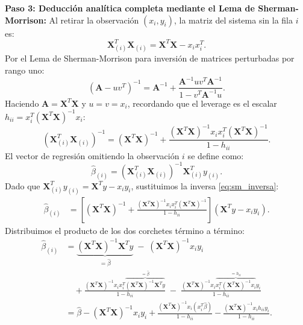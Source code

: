 \documentclass[11pt,a4paper]{article}
\begin{document}
\begin{demobox}
\textbf{Paso 3: Deducción analítica completa mediante el Lema de Sherman-Morrison:}  
Al retirar la observación $(x_i, y_i)$, la matriz del sistema sin la fila $i$ es:
\begin{equation}
\mathbf{X}_{(i)}^T \mathbf{X}_{(i)} = \mathbf{X}^T \mathbf{X} - x_i x_i^T.
\end{equation}
Por el Lema de Sherman-Morrison para inversión de matrices perturbadas por rango uno:
\begin{equation}
(\mathbf{A} - u v^T)^{-1} = \mathbf{A}^{-1} + \frac{\mathbf{A}^{-1} u v^T \mathbf{A}^{-1}}{1 - v^T \mathbf{A}^{-1} u}.
\end{equation}
Haciendo $\mathbf{A} = \mathbf{X}^T \mathbf{X}$ y $u = v = x_i$, recordando que el leverage es el escalar $h_{ii} = x_i^T (\mathbf{X}^T \mathbf{X})^{-1} x_i$:
\begin{equation}
(\mathbf{X}_{(i)}^T \mathbf{X}_{(i)})^{-1} = (\mathbf{X}^T \mathbf{X})^{-1} + \frac{(\mathbf{X}^T \mathbf{X})^{-1} x_i x_i^T (\mathbf{X}^T \mathbf{X})^{-1}}{1 - h_{ii}}. \label{eq:sm_inversa}
\end{equation}
El vector de regresión omitiendo la observación $i$ se define como:
\begin{equation}
\hat{\beta}_{(i)} = (\mathbf{X}_{(i)}^T \mathbf{X}_{(i)})^{-1} \mathbf{X}_{(i)}^T y_{(i)}.
\end{equation}
Dado que $\mathbf{X}_{(i)}^T y_{(i)} = \mathbf{X}^T y - x_i y_i$, sustituimos la inversa \eqref{eq:sm_inversa}:
\begin{align}
\hat{\beta}_{(i)} &= \left[ (\mathbf{X}^T \mathbf{X})^{-1} + \frac{(\mathbf{X}^T \mathbf{X})^{-1} x_i x_i^T (\mathbf{X}^T \mathbf{X})^{-1}}{1 - h_{ii}} \right] (\mathbf{X}^T y - x_i y_i).
\end{align}
Distribuimos el producto de los dos corchetes término a término:
\begin{align}
\hat{\beta}_{(i)} &= \underbrace{(\mathbf{X}^T \mathbf{X})^{-1} \mathbf{X}^T y}_{= \hat{\beta}} \;-\; (\mathbf{X}^T \mathbf{X})^{-1} x_i y_i \\
&\quad + \frac{(\mathbf{X}^T \mathbf{X})^{-1} x_i x_i^T \overbrace{(\mathbf{X}^T \mathbf{X})^{-1} \mathbf{X}^T y}^{= \hat{\beta}}}{1 - h_{ii}} \;-\; \frac{(\mathbf{X}^T \mathbf{X})^{-1} x_i \overbrace{x_i^T (\mathbf{X}^T \mathbf{X})^{-1} x_i}^{= h_{ii}} y_i}{1 - h_{ii}} \\[0.6em]
&= \hat{\beta} - (\mathbf{X}^T \mathbf{X})^{-1} x_i y_i + \frac{(\mathbf{X}^T \mathbf{X})^{-1} x_i (x_i^T \hat{\beta})}{1 - h_{ii}} - \frac{(\mathbf{X}^T \mathbf{X})^{-1} x_i h_{ii} y_i}{1 - h_{ii}}.

\end{align}
\end{demobox}
\end{document}
